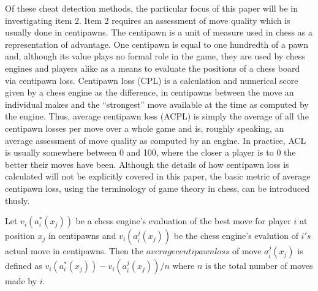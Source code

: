 \documentclass[12pt, letterpaper, titlepage]{article}
\begin{document}
Of these cheat detection methods, the particular focus of this paper will be in investigating item 2. Item 2 requires an assessment of move quality which is usually done in centipawns. The centipawn is a unit of measure used in chess as a representation of advantage. One centipawn is equal to one hundredth of a pawn and, although its value plays no formal role in the game, they are used by chess engines and players alike as a means to evaluate the positions of a chess board via centipawn loss. Centipawn loss (CPL) is a calculation and numerical score given by a chess engine as the difference, in centipawns between the move an individual makes and the “strongest” move available at the time as computed by the engine. Thus, average centipawn loss (ACPL) is simply the average of all the centipawn losses per move over a whole game and is, roughly speaking, an average assessment of move quality as computed by an engine. In practice, ACL is usually somewhere between 0 and 100, where the closer a player is to 0 the better their moves have been\citep{avva2022guess}. Although the details of how centipawn loss is calculated will not be explicitly covered in this paper, the basic metric of average centipawn loss, using the terminology of game theory in chess, can be introduced thusly.

Let \begin{math}v_{i}(a_{i}^*(x_{j}))\end{math} be a chess engine's evaluation of the best move for player \begin{math}i\end{math} at position \begin{math}x_{j}\end{math} in centipawns and \begin{math}v_{i}(a_{i}^j(x_{j}))\end{math} be the chess engine's evalution of \begin{math}i's\end{math} actual move in centipawns. Then the \begin{math}average centipawn loss\end{math} of move \begin{math}a_{i}^j(x_{j})\end{math} is defined as \begin{math}v_{i}(a_{i}^*(x_{j})) - v_{i}(a_{i}^j(x_{j}))/n\end{math} where \begin{math}n\end{math} is the total number of moves made by \begin{math}i\end{math}\citet{anbarciai}.
\end{document}
